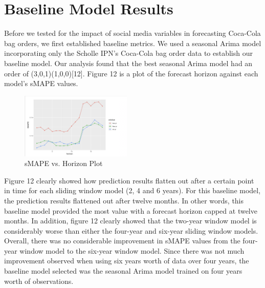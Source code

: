 \documentclass[12pt,oneside]{chicagocapstone}
\begin{document}
\hypertarget{baseline-model-results}{%
\section*{Baseline Model Results}\label{baseline-model-results}}

Before we tested for the impact of social media variables in forecasting Coca-Cola bag orders, we first established baseline metrics. We used a seasonal Arima model incorporating only the Scholle IPN's Coca-Cola bag order data to establish our baseline model. Our analysis found that the best seasonal Arima model had an order of (3,0,1)(1,0,0){[}12{]}. Figure 12 is a plot of the forecast horizon against each model's sMAPE values.
\begin{figure}

{\centering \includegraphics[width=200px,angle = 0, scale=2.1]{figure/SMAPEvsHorizon} 

}

\caption{sMAPE vs. Horizon Plot}\label{fig:SMAPEvsHorizon}
\end{figure}
Figure 12 clearly showed how prediction results flatten out after a certain point in time for each sliding window model (2, 4 and 6 years). For this baseline model, the prediction results flattened out after twelve months. In other words, this baseline model provided the most value with a forecast horizon capped at twelve months. In addition, figure 12 clearly showed that the two-year window model is considerably worse than either the four-year and six-year sliding window models. Overall, there was no considerable improvement in sMAPE values from the four-year window model to the six-year window model. Since there was not much improvement observed when using six years worth of data over four years, the baseline model selected was the seasonal Arima model trained on four years worth of observations.
\end{document}
